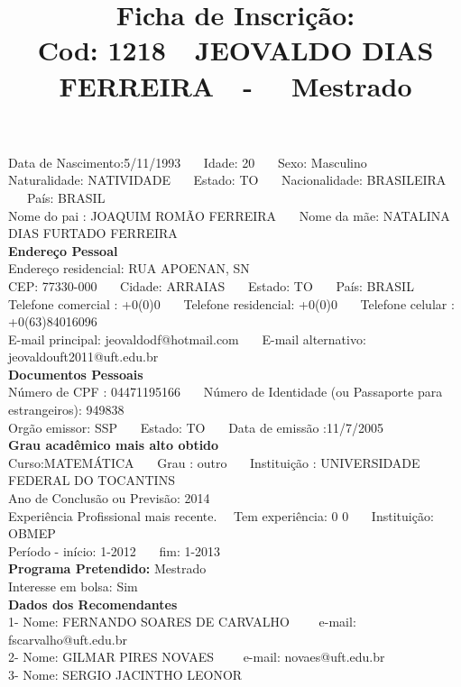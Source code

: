 \documentclass[11pt]{article}
\title{\vspace*{-4cm} Ficha de Inscrição: \\Cod: 1218\ \ JEOVALDO  DIAS FERREIRA\ \ - \ \ Mestrado 
 }
\date{}
\begin{document}
\maketitle
\vspace*{-1.5cm}
\noindent Data de Nascimento:5/11/1993
\ \ \ Idade: 20   \ \ \ Sexo: Masculino
\\
Naturalidade: NATIVIDADE  
\ \ \  Estado: TO
\ \ \  Nacionalidade: BRASILEIRA
\ \ \ País: BRASIL
\\        
Nome do pai : JOAQUIM ROMÃO FERREIRA
\ \ \ Nome da mãe: NATALINA DIAS FURTADO FERREIRA          
\\[0.2cm]                     
\textbf{Endereço Pessoal} 
\\ 
\noindent Endereço residencial: RUA APOENAN, SN
\\
        CEP: 77330-000 
\ \ \ Cidade: ARRAIAS 
\ \ \ Estado: TO 
\ \ \ País: BRASIL
\\		
		Telefone comercial : +0(0)0
\ \ \ Telefone residencial: +0(0)0
\ \ \ Telefone celular : +0(63)84016096
\\
E-mail principal: jeovaldodf@hotmail.com
\ \ \ E-mail alternativo: jeovaldouft2011@uft.edu.br 
\\[0.2cm] 
\textbf{Documentos Pessoais}
\\
\noindent Número de CPF : 04471195166
\ \ \ Número de Identidade (ou Passaporte para estrangeiros): 949838
\\
Orgão emissor: SSP
\ \ \ Estado: TO
\ \ \ Data de emissão :11/7/2005
\\[0.3cm]
\textbf{Grau acadêmico mais alto obtido}
\\	
Curso:MATEMÁTICA
\ \ \ Grau : outro
\ \ \ Instituição : UNIVERSIDADE FEDERAL DO TOCANTINS
\\			
Ano de Conclusão ou Previsão: 2014
\\ 
Experiência Profissional mais recente. \ \  
Tem experiência: 0 0  
\ \ \ Instituição: OBMEP
\\  
Período - início: 1-2012
\ \ \ fim: 1-2013
\\[0.2cm] 
\textbf{Programa Pretendido:} Mestrado\\
Interesse em bolsa: Sim
\\[0.3cm]		
\textbf{Dados dos Recomendantes} 
\\
1- Nome: FERNANDO SOARES DE CARVALHO
\ \ \ \  e-mail: fscarvalho@uft.edu.br 
\\
2- Nome: GILMAR PIRES NOVAES
\ \ \ \ e-mail: novaes@uft.edu.br
\\
3- Nome: SERGIO JACINTHO LEONOR
\end{document}
